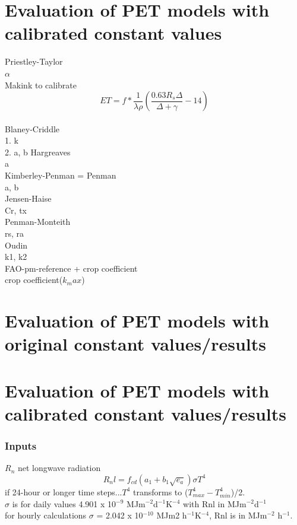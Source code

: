 \documentclass[hydrology,article,submit,moreauthors,pdftex]{Definitions/mdpi}
\begin{document}
\section{Evaluation of PET models with calibrated constant values}

Priestley-Taylor \\
$\alpha$
\\
Makink to calibrate \cite{asce2005asce}
\begin{equation}
ET = f * \frac{1}{\lambda \rho} \left(\frac{0.63 R_s \Delta}{\Delta+\gamma}-14 \right)
\end{equation}
\\
Blaney-Criddle \\
1. k \\
2. a, b 
Hargreaves \\
a \\
Kimberley-Penman = Penman \\
a, b \\
Jensen-Haise \\
Cr, tx \\
Penman-Monteith \\
rs, ra \\
Oudin \\
k1, k2 \\
FAO-pm-reference + crop coefficient \\
crop coefficient($k_max$) 
\section{Evaluation of PET models with original constant values/results}
\section{Evaluation of PET models with calibrated constant values/results}



\subsubsection{Inputs}

$R_n$ net longwave radiation
\begin{equation}
R_nl = f_{cd} (a_1+b_1\sqrt{e_a})\sigma T^4
\end{equation}
if 24-hour or longer time steps...$T^4$ transforms to ($T^4_{max}-T^4_{min}$)/2. \\
$\sigma$ is for daily values 4.901 x 10$^{-9}$ MJm$^{-2}$d$^{-1}$K$^{-4}$ with Rnl in MJm$^{-2}$d$^{-1}$ \\
for hourly calculations $\sigma$ = 2.042 x 10$^{-10}$ MJm2 h$^{-1}$K$^{-4}$, Rnl is in MJm$^{-2}$ h$^{-1}$.
\end{document}
